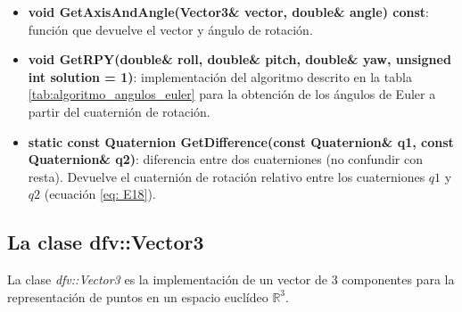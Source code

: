 \documentclass[12pt, a4paper]{report}
\begin{document}
\begin{itemize}
\item \textbf{void GetAxisAndAngle(Vector3\& vector, double\& angle) const}: función que devuelve el vector y ángulo de rotación.
\item \textbf{void GetRPY(double\& roll, double\& pitch, double\& yaw, unsigned int solution = 1)}: implementación del algoritmo descrito en la tabla \ref{tab:algoritmo_angulos_euler} para la obtención de los ángulos de Euler a partir del cuaternión de rotación.
\item \textbf{static const Quaternion GetDifference(const Quaternion\& q1, const Quaternion\& q2)}: diferencia entre dos cuaterniones (no confundir con resta). Devuelve el cuaternión de rotación relativo entre los cuaterniones $q1$ y $q2$ (ecuación \eqref{eq: E18}).  

\end{itemize}

\subsection{La clase dfv::Vector3}

La clase \textit{dfv::Vector3} es la implementación de un vector de 3 componentes para la representación de puntos en un espacio euclídeo $\mathbb{R}^3$. 
\end{document}
